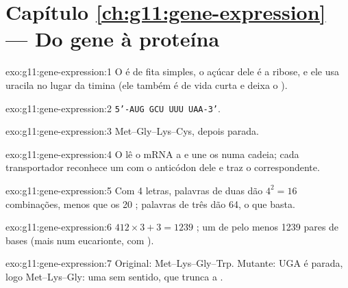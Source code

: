 \section*{Capítulo \ref{ch:g11:gene-expression} --- Do gene à proteína}

\begin{solution}{exo:g11:gene-expression:1}
O  é de fita simples, o açúcar dele é a ribose, e ele usa uracila no
lugar da timina (ele também é de vida curta e deixa o ).
\end{solution}

\begin{solution}{exo:g11:gene-expression:2}
\texttt{5'-AUG GCU UUU UAA-3'}.
\end{solution}

\begin{solution}{exo:g11:gene-expression:3}
Met--Gly--Lys--Cys, depois parada.
\end{solution}

\begin{solution}{exo:g11:gene-expression:4}
O  lê o mRNA  a  e une os  numa cadeia;
cada  transportador reconhece um  com o anticódon dele e traz o
 correspondente.
\end{solution}

\begin{solution}{exo:g11:gene-expression:5}
Com 4 letras, palavras de duas dão $4^2 = 16$ combinações, menos que os
20 ; palavras de três dão 64, o que basta.
\end{solution}

\begin{solution}{exo:g11:gene-expression:6}
$412 \times 3 + 3 = 1239$ ; um  de pelo menos 1239
pares de bases (mais num eucarionte, com ).
\end{solution}

\begin{solution}{exo:g11:gene-expression:7}
Original: Met--Lys--Gly--Trp. Mutante: UGA é parada, logo
Met--Lys--Gly: uma  sem sentido, que trunca a .
\end{solution}

